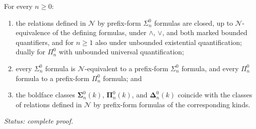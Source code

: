 \begin{theorem}
\label{thm:prefix-normal-form}
For every \(n\geq0\):
\begin{enumerate}[label=(\alph*)]
\item the relations defined in \(\mathcal N\) by prefix-form
      \(\Sigma^0_n\) formulas are closed, up to \(\mathcal N\)-equivalence
      of the defining formulas, under \(\land\), \(\lor\), and both marked
      bounded quantifiers, and for \(n\geq1\) also under unbounded
      existential quantification; dually for \(\Pi^0_n\) with unbounded
      universal quantification;
\item every \(\Sigma^0_n\) formula is \(\mathcal N\)-equivalent to a
      prefix-form \(\Sigma^0_n\) formula, and every \(\Pi^0_n\) formula to
      a prefix-form \(\Pi^0_n\) formula; and
\item the boldface classes \(\boldsymbol{\Sigma}^0_n(k)\),
      \(\boldsymbol{\Pi}^0_n(k)\), and \(\boldsymbol{\Delta}^0_n(k)\)
      coincide with the classes of relations defined in \(\mathcal N\) by
      prefix-form formulas of the corresponding kinds.
\end{enumerate}
\textit{Status: complete proof.}
\end{theorem}


